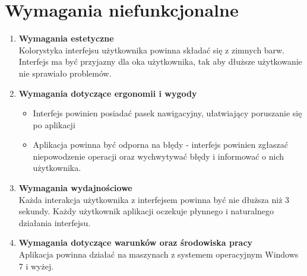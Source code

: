 \section{Wymagania niefunkcjonalne}
\begin{enumerate}
    \item \textbf{Wymagania estetyczne} \\
    Kolorystyka interfejsu użytkownika powinna składać się z zimnych barw. Interfejs ma być przyjazny dla oka użytkownika, tak aby dłuższe użytkowanie nie sprawiało problemów.
    \\
    \item \textbf{Wymagania dotyczące ergonomii i wygody}
    \begin{itemize}
        \item Interfejs powinien posiadać pasek nawigacyjny, ułatwiający poruszanie się po aplikacji
        \item Aplikacja powinna być odporna na błędy - interfejs powinien zgłaszać niepowodzenie operacji oraz wychwytywać błędy i informować o nich użytkownika. \\
    \end{itemize}
    
    \item \textbf{Wymagania wydajnościowe}\\
    Każda interakcja użytkownika z interfejsem powinna być nie dłuższa niż 3 sekundy. Każdy użytkownik aplikacji oczekuje płynnego i naturalnego działania interfejsu. \\
    
    \item \textbf{Wymagania dotyczące warunków oraz środowiska pracy}\\
    Aplikacja powinna działać na maszynach z systemem operacyjnym Windows 7 i wyżej.
\end{enumerate}